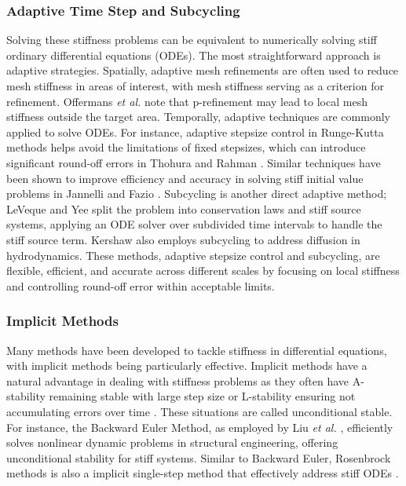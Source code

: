 \subsubsection*{Adaptive Time Step and Subcycling}
Solving these stiffness problems can be equivalent to numerically solving stiff ordinary differential equations (ODEs). The most straightforward approach is adaptive strategies. Spatially, adaptive mesh refinements are often used to reduce mesh stiffness in areas of interest, with mesh stiffness serving as a criterion for refinement. Offermans \textit{et al.} \cite{offermans2020adaptive} note that p-refinement may lead to local mesh stiffness outside the target area. Temporally, adaptive techniques are commonly applied to solve ODEs. For instance, adaptive stepsize control in Runge-Kutta methods helps avoid the limitations of fixed stepsizes, which can introduce significant round-off errors in Thohura and Rahman \cite{thohura2010comparison}. Similar techniques have been shown to improve efficiency and accuracy in solving stiff initial value problems in Jannelli and Fazio \cite{jannelli2006adaptive}. Subcycling is another direct adaptive method; LeVeque and Yee \cite{LeVeque1998} split the problem into conservation laws and stiff source systems, applying an ODE solver over subdivided time intervals to handle the stiff source term. Kershaw \cite{kershaw1981differencing} also employs subcycling to address diffusion in hydrodynamics. These methods, adaptive stepsize control and subcycling, are flexible, efficient, and accurate across different scales by focusing on local stiffness and controlling round-off error within acceptable limits.

\subsubsection*{Implicit Methods}
Many methods have been developed to tackle stiffness in differential equations, with implicit methods being particularly effective. Implicit methods have a natural advantage in dealing with stiffness problems as they often have A-stability remaining stable with large step size or L-stability ensuring not accumulating errors over time \cite{alamri2022very}. These situations are called unconditional stable. For instance, the Backward Euler Method, as employed by Liu \textit{et al.} \cite{liu2012efficient}, efficiently solves nonlinear dynamic problems in structural engineering, offering unconditional stability for stiff systems. Similar to Backward Euler, Rosenbrock methods is also a implicit single-step method that effectively address stiff ODEs \cite{shampine1982implementation}.

